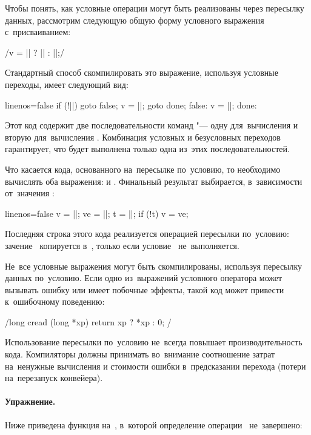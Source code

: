 Чтобы понять, как условные операции могут быть реализованы через пересылку данных, рассмотрим следующую общую форму условного выражения с~присваиванием:

\cc/v = || ? || : ||;/

Стандартный способ скомпилировать это выражение, используя условные переходы, имеет следующий вид:

\begin{ccode*}{linenos=false}
  if (!||)
    goto false;
  v = ||;
  goto done;
false:
  v = ||;
done:
\end{ccode*}

Этот код содержит две последовательности команд "--- одну для~вычисления  и вторую для~вычисления . Комбинация условных и безусловных переходов гарантирует, что будет выполнена только одна из~этих последовательностей.

Что касается кода, основанного на~пересылке по~условию, то необходимо вычислять оба выражения:  и . Финальный результат выбирается, в~зависимости от~значения :

\begin{ccode*}{linenos=false}
  v  = ||;
  ve = ||;
  t  = ||;
  if (!t) v = ve;
\end{ccode*}

Последняя строка этого кода реализуется операцией пересылки по~условию: зачение~ копируется в~, только если условие~ не~выполняется.

Не~все условные выражения могут быть скомпилированы, используя пересылку данных по~условию. Если одно из~выражений условного оператора может вызывать ошибку или имеет побочные эффекты, такой код может привести к~ошибочному поведению:

\cc/long cread (long *xp)  { return xp ? *xp : 0; }/

Использование пересылки по~условию не~всегда повышает производительность кода. Компиляторы должны принимать во~внимание соотношение затрат на~ненужные вычисления и стоимости ошибки в~предсказании перехода (потери на~перезапуск конвейера).



\paragraph{Упражнение.}
Ниже приведена функция на~, в~которой определение операции~ не~завершено:

